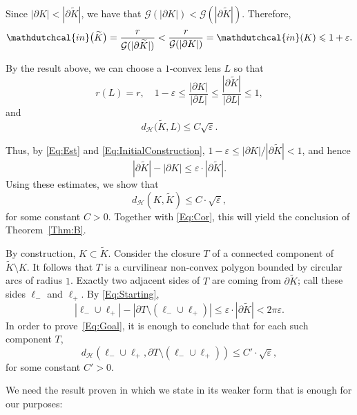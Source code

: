 \documentclass[11pt, oneside]{amsart}
\newcommand{\dH}{d_{\mathcal H}}
\newcommand{\Rr}{\mathdutchcal{in}}
\renewcommand{\tilde}{\widetilde}
\newcommand{\eps}{\varepsilon}
\newcommand{\sm}{\setminus}
\renewcommand{\le}{\leqslant}
\theoremstyle{theorem}
\theoremstyle{Intro}
\theoremstyle{definition}
\theoremstyle{remark}
\theoremstyle{claim}
\numberwithin{equation}{section}
\begin{document}
Since $|\partial K| < |\partial \tilde K|$, we have that $\mathcal G(|\partial K|) < \mathcal G(|\partial \tilde K|)$. Therefore,
\[
\Rr\big(\tilde K\big) = \frac{r}{\mathcal G(|\partial \tilde K|)}  < \frac{r}{\mathcal G(|\partial K|)} = \Rr (K) \le 1 + \eps.
\]

By the result above, we can choose a $1$-convex lens $L$ so that
\begin{equation}
\label{Eq:Est}
r(L) = r, \quad 1 - \eps \le \frac{|\partial K|}{|\partial L|} \le \frac{|\partial \tilde K|}{|\partial L|} \le 1,
\end{equation}
and 
\begin{equation}
\label{Eq:Cor}
\dH\big(\tilde K, L\big) \le C \sqrt{\eps}.
\end{equation}

Thus, by \eqref{Eq:Est} and \eqref{Eq:InitialConstruction}, $1 - \eps \le {|\partial K|}/{|\partial \tilde K|} < 1$, and hence 
\begin{equation}
\label{Eq:Starting}
|\partial \tilde K| - |\partial K| \le \eps \cdot |\partial \tilde K|.
\end{equation}
Using these estimates, we show that 
\begin{equation}
\label{Eq:Goal}
\dH(K, \tilde K) \le C \cdot \sqrt{\eps},
\end{equation}
for some constant $C > 0$. Together with \eqref{Eq:Cor}, this will yield the conclusion of Theorem~\ref{Thm:B}.

By construction, $K \subset \tilde K$. Consider the closure $T$ of a connected component of $\tilde K \sm K$. It follows that $T$ is a curvilinear non-convex polygon bounded by circular arcs of radius $1$. Exactly two adjacent sides of $T$ are coming from $\partial \tilde K$; call these sides $\ell_-$ and $\ell_+$. By \eqref{Eq:Starting},
\begin{equation}
\label{Eq:BE}
|\ell_- \cup \ell_+| - |\partial T \sm (\ell_- \cup \ell_+)| \le \eps \cdot |\partial \tilde K| < 2\pi \eps. 
\end{equation}
In order to prove~\eqref{Eq:Goal}, it is enough to conclude that for each such component $T$,
\begin{equation}
    \label{Eq:Goal2}
    \dH(\ell_- \cup \ell_+, \partial T \sm (\ell_- \cup \ell_+)) \le C' \cdot \sqrt{\eps},
\end{equation}
for some  constant $C' > 0$.

We need the result proven in \cite[Section 6.7.2]{BZConvex} which we state in its weaker form that is enough for our purposes:
\end{document}
